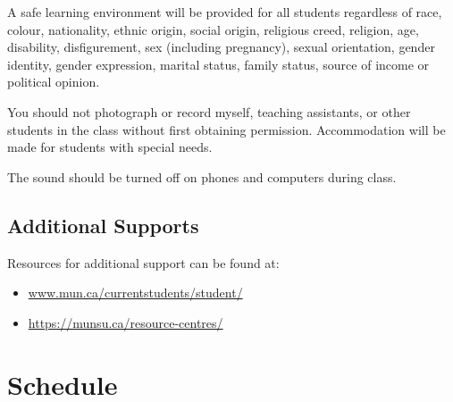 \documentclass[
]{book}
\begin{document}
A safe learning environment will be provided for all students regardless of race, colour, nationality, ethnic origin, social origin, religious creed, religion, age, disability, disfigurement, sex (including pregnancy), sexual orientation, gender identity, gender expression, marital status, family status, source of income or political opinion.

You should not photograph or record myself, teaching assistants, or other students in the class without first obtaining permission. Accommodation will be made for students with special needs.

The sound should be turned off on phones and computers during class.

\hypertarget{additional-supports}{%
\section{Additional Supports}\label{additional-supports}}

Resources for additional support can be found at:

\begin{itemize}
\item
  \url{www.mun.ca/currentstudents/student/}
\item
  \url{https://munsu.ca/resource-centres/}
\end{itemize}

\hypertarget{schedule}{%
\chapter{Schedule}\label{schedule}}
\end{document}
